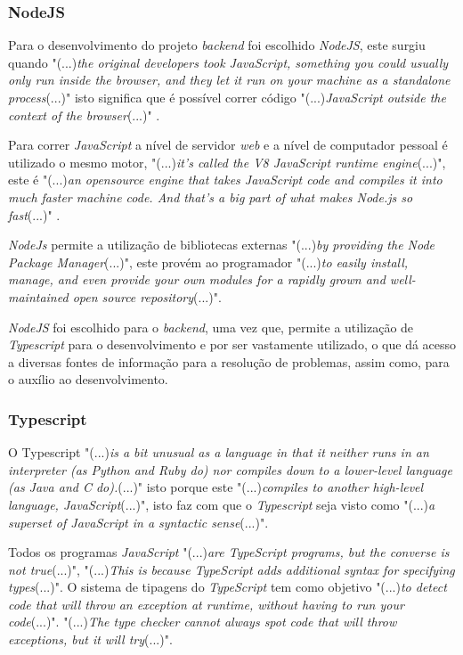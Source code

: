 \subsubsection{NodeJS}

Para o desenvolvimento do projeto \emph{backend} foi escolhido \textit{NodeJS}, este surgiu quando "(...)\emph{the original developers took JavaScript, something you could usually only run inside the browser, and they let it run on your machine as a standalone process}(...)"\citep{design_node} isto significa que é possível correr código "(...)\emph{JavaScript outside the context of the browser}(...)"\citep{design_node} .

Para correr \textit{JavaScript} a nível de servidor \emph{web} e a nível de computador pessoal é utilizado o mesmo motor, "(...)\emph{it's called the V8 JavaScript runtime engine}(...)"\citep{design_node}, este é "(...)\emph{an opensource engine that takes JavaScript code and compiles it into much faster machine code. And that's a big part of what makes Node.js so fast}(...)"\citep{design_node} .

\textit{NodeJs} permite a utilização de bibliotecas externas "(...)\emph{by providing the Node Package Manager}(...)"\citep{design_node}, este provém ao programador "(...)\emph{to easily install, manage, and even provide your own modules for a rapidly grown and well-maintained open source repository}(...)"\citep{design_node}.

\textit{NodeJS} foi escolhido para o \textit{backend}, uma vez que, permite a utilização de \textit{Typescript} para o desenvolvimento e por ser vastamente utilizado, o que dá acesso a diversas fontes de informação para a resolução de problemas, assim como, para o auxílio ao desenvolvimento.

\newpage

\subsubsection{Typescript}
O Typescript "(...)\emph{is a bit unusual as a language in that it neither runs in an interpreter (as Python and Ruby do) nor compiles down to a lower-level language (as Java and C do).}(...)"\citep{typescript} isto porque este "(...)\emph{compiles to another high-level language, JavaScript}(...)"\citep{typescript}, isto faz com que o \emph{Typescript} seja visto como "(...)\emph{a superset of JavaScript in a syntactic sense}(...)"\citep{typescript}.

Todos os programas \emph{JavaScript} "(...)\emph{are TypeScript programs, but the converse is not true}(...)"\citep{typescript}, "(...)\emph{This is because TypeScript adds additional syntax for specifying types}(...)"\citep{typescript}. O sistema de tipagens do \emph{TypeScript} tem como objetivo "(...)\emph{to detect code that will throw an exception at runtime, without having to run your code}(...)"\citep{typescript}. "(...)\emph{The type checker cannot always spot code that will throw exceptions, but it will try}(...)"\citep{typescript}.

